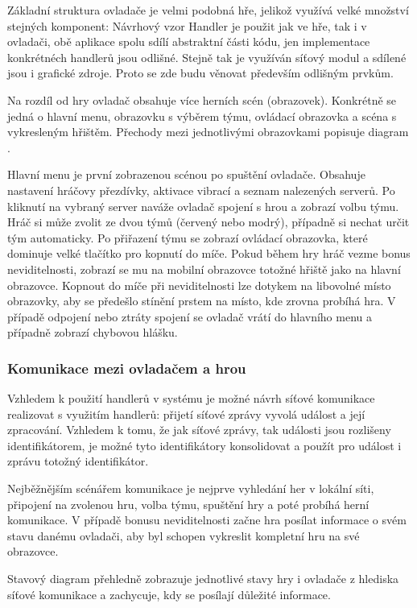 \documentclass[thesis=B,czech,hidelinks]{FITthesis}[2012/06/26] %
\begin{document}
Základní struktura ovladače je velmi podobná hře, jelikož využívá velké množství stejných komponent: Návrhový vzor Handler je použit jak ve hře, tak i v ovladači, obě aplikace spolu sdílí abstraktní části kódu, jen implementace konkrétnéch handlerů jsou odlišné. Stejně tak je využíván síťový modul a sdílené jsou i grafické zdroje. Proto se zde budu věnovat především odlišným prvkům.

Na rozdíl od hry ovladač obsahuje více herních scén (obrazovek). Konkrétně se jedná o hlavní menu, obrazovku s výběrem týmu, ovládací obrazovka a scéna s vykresleným hřištěm. Přechody mezi jednotlivými obrazovkami popisuje diagram .

Hlavní menu je první zobrazenou scénou po spuštění ovladače. Obsahuje nastavení hráčovy přezdívky, aktivace vibrací a seznam nalezených serverů. Po kliknutí na vybraný server naváže ovladač spojení s hrou a zobrazí volbu týmu. Hráč si může zvolit ze dvou týmů (červený nebo modrý), případně si nechat určit tým automaticky. Po přiřazení týmu se zobrazí ovládací obrazovka, které dominuje velké tlačítko pro kopnutí do míče. Pokud během hry hráč vezme bonus neviditelnosti, zobrazí se mu na mobilní obrazovce totožné hřiště jako na hlavní obrazovce. Kopnout do míče při neviditelnosti lze dotykem na libovolné místo obrazovky, aby se předešlo stínění prstem na místo, kde zrovna probíhá hra. V případě odpojení nebo ztráty spojení se ovladač vrátí do hlavního menu a případně zobrazí chybovou hlášku.

\subsubsection{Komunikace mezi ovladačem a hrou}

Vzhledem k použití handlerů v systému je možné návrh síťové komunikace realizovat s využitím handlerů: přijetí síťové zprávy vyvolá událost a její zpracování. Vzhledem k tomu, že jak síťové zprávy, tak události jsou rozlišeny identifikátorem, je možné tyto identifikátory konsolidovat a použít pro událost i zprávu totožný identifikátor. 

Nejběžnějším scénářem komunikace je nejprve vyhledání her v lokální síti, připojení na zvolenou hru, volba týmu, spuštění hry a poté probíhá herní komunikace. V případě bonusu neviditelnosti začne hra posílat informace o svém stavu danému ovladači, aby byl schopen vykreslit kompletní hru na své obrazovce.

Stavový diagram  přehledně zobrazuje jednotlivé stavy hry i ovladače z hlediska síťové komunikace a zachycuje, kdy se posílají důležité informace.
\end{document}
